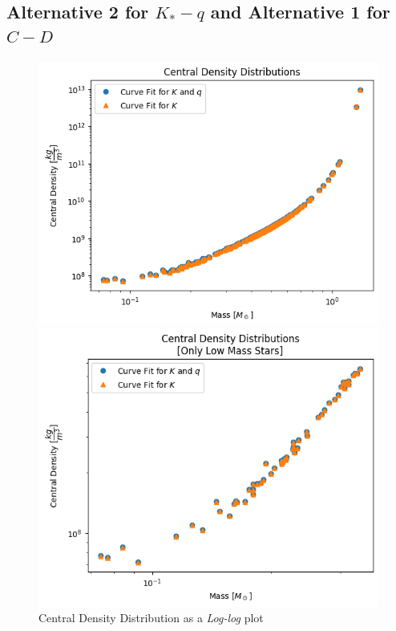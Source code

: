 \documentclass[letterpaper,12pt]{article}
\begin{document}
\subsection{Alternative 2 for $K_* - q$ and Alternative 1 for $C-D$}


\begin{figure}[H]
\begin{minipage}{.5\textwidth}
\centerline{\includegraphics[width=\linewidth]{figures/appendix/2_1_1_n_ll_rho_m.png}}
\end{minipage}
\begin{minipage}{.5\textwidth}
\centerline{\includegraphics[width=\linewidth]{figures/appendix/2_1_2_n_ll_rho_m_.png}}
\end{minipage}
\caption{Central Density Distribution as a \textit{Log-log} plot}
\end{figure}
\end{document}
